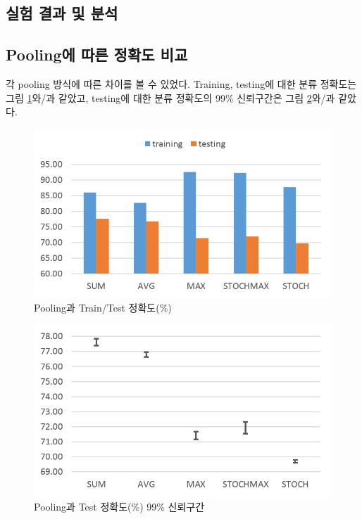 \documentclass[a4paper,9pt]{article}
\begin{document}
\begin{multicols*}{2}
\section{실험 결과 및 분석}

\subsection{Pooling에 따른 정확도 비교}

각 pooling 방식에 따른 차이를 볼 수 있었다.
Training, testing에 대한 분류 정확도는 그림 \ref{fig:accuracy}와/과 같았고, testing에 대한 분류 정확도의 99\% 신뢰구간은 그림 \ref{fig:error_bar}와/과 같았다.

\begin{figure}[H]
\includegraphics[width=\linewidth]{accuracy}
\caption{Pooling과 Train/Test 정확도(\%)}
\label{fig:accuracy}
\end{figure}

\begin{figure}[H]
\includegraphics[width=\linewidth]{error_bar}
\caption{Pooling과 Test 정확도(\%) 99\% 신뢰구간}
\label{fig:error_bar}
\end{figure}


\end{multicols*}
\end{document}

